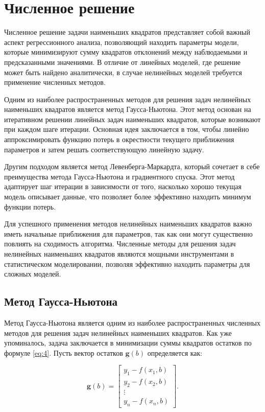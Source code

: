 \documentclass[11pt,a4paper]{article}
\begin{document}
\section{Численное решение}

Численное решение задачи наименьших квадратов представляет собой важный аспект регрессионного анализа, позволяющий находить параметры модели, которые минимизируют сумму квадратов отклонений между наблюдаемыми и предсказанными значениями. В отличие от линейных моделей, где решение может быть найдено аналитически, в случае нелинейных моделей требуется применение численных методов.

Одним из наиболее распространенных методов для решения задач нелинейных наименьших квадратов является метод Гаусса-Ньютона. Этот метод основан на итеративном решении линейных задач наименьших квадратов, которые возникают при каждом шаге итерации. Основная идея заключается в том, чтобы линейно аппроксимировать функцию потерь в окрестности текущего приближения параметров и затем решать соответствующую линейную задачу.

Другим подходом является метод Левенберга-Маркардта, который сочетает в себе преимущества метода Гаусса-Ньютона и градиентного спуска. Этот метод адаптирует шаг итерации в зависимости от того, насколько хорошо текущая модель описывает данные, что позволяет более эффективно находить минимум функции потерь.

Для успешного применения методов нелинейных наименьших квадратов важно иметь начальные приближения для параметров, так как они могут существенно повлиять на сходимость алгоритма. Численные методы для решения задач нелинейных наименьших квадратов являются мощными инструментами в статистическом моделировании, позволяя эффективно находить параметры для сложных моделей.

\subsection{Метод Гаусса-Ньютона}
Метод Гаусса-Ньютона является одним из наиболее распространенных численных методов для решения задач нелинейных наименьших квадратов. Как уже упоминалось, задача заключается в минимизации суммы квадратов остатков по формуле \ref{eq:4}. Пусть вектор остатков $\mathbf{g}(b)$ определяется как:

\begin{equation}
\mathbf{g}(b) = \begin{bmatrix}
y_1 - f(x_1, b) \\
y_2 - f(x_2, b) \\
\vdots \\
y_n - f(x_n, b)
\end{bmatrix}.
\end{equation}
\end{document}

